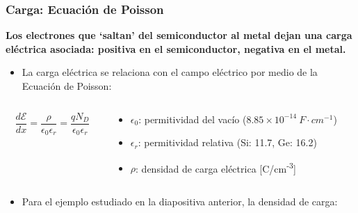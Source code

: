 \documentclass[10pt,t,aspectratio=169]{beamer}
\begin{document}
\begin{frame}[t]
    \frametitle{Carga: Ecuación de Poisson}

    \begin{tcolorbox}
        \centering\textbf{Los electrones que `saltan' del semiconductor al metal dejan una carga eléctrica asociada: positiva en el semiconductor, negativa en el metal.}
    \end{tcolorbox}

    \begin{itemize}
        \item La carga eléctrica se relaciona con el campo eléctrico por medio de la Ecuación de Poisson:
    \end{itemize}
    \begin{columns}
    
        \begin{column}{0.4\textwidth}
        
            \[ \dfrac{d\mathcal{E}}{dx} = \dfrac{\rho}{\epsilon_0 \epsilon_r} = \dfrac{q N_D}{\epsilon_0 \epsilon_r} \]
            
        \end{column}
        
        \begin{column}{0.6\textwidth}
        
            \begin{itemize}
                \item $\epsilon_0$: permitividad del vacío ($8.85\times{}10^{-14}\ F\cdot{}cm^{-1}$)
                \item $\epsilon_r$: permitividad relativa (Si: 11.7, Ge: 16.2)
                \item $\rho$: densidad de carga eléctrica [C/cm\textsuperscript{-3}]
            \end{itemize}
            
        \end{column}
        
    \end{columns}

    \vspace{2mm}
    \begin{itemize}
        \item Para el ejemplo estudiado en la diapositiva anterior, la densidad de carga:
    \end{itemize}

    \begin{columns}
    

\end{columns}
\end{frame}
\end{document}
